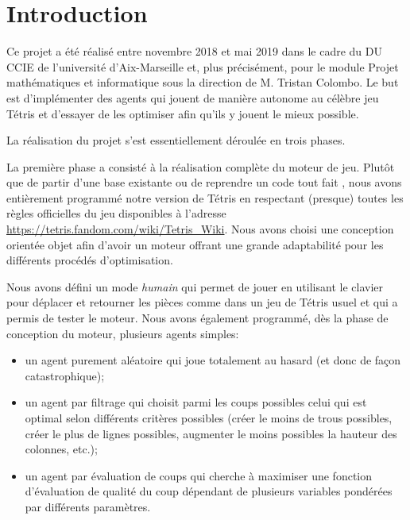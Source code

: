 \chapter*{Introduction}

Ce projet a été réalisé entre novembre 2018 et mai 2019 dans le cadre du DU CCIE de l'université d'Aix-Marseille et, plus précisément, pour le module \og Projet mathématiques et informatique \fg{} sous la direction de M. Tristan Colombo. Le but est d'implémenter des agents qui jouent de manière autonome au célèbre jeu Tétris et d'essayer de les optimiser afin qu'ils y jouent le mieux possible.

\bigskip

La réalisation du projet s'est essentiellement déroulée en trois phases.

\bigskip

La première phase a consisté à la réalisation complète du moteur de jeu. Plutôt que de partir d'une base existante ou de reprendre un code \og tout fait \fg{}, nous avons entièrement programmé \og notre \fg{} version de Tétris en respectant (presque) toutes les règles officielles du jeu disponibles à l'adresse \href{https://tetris.fandom.com/wiki/Tetris_Wiki}{https://tetris.fandom.com/wiki/Tetris\_Wiki}. Nous avons choisi une conception orientée objet afin d'avoir un moteur offrant une grande adaptabilité pour les différents procédés d'optimisation.

Nous avons défini un mode \textit{humain} qui permet de jouer en utilisant le clavier pour déplacer et retourner les pièces comme dans un jeu de Tétris usuel et qui a permis de tester le moteur. Nous avons également programmé, dès la phase de conception du moteur, plusieurs agents simples:
\begin{itemize}
	\item un agent purement aléatoire qui joue totalement au hasard (et donc de façon catastrophique);
	\item un agent par filtrage qui choisit parmi les coups possibles celui qui est optimal selon différents critères possibles (créer le moins de trous possibles, créer le plus de lignes possibles, augmenter le moins possibles la hauteur des colonnes, etc.);
	\item un agent par évaluation de coups qui cherche à maximiser une fonction d'évaluation de qualité du coup dépendant de plusieurs variables pondérées par différents paramètres.
\end{itemize}

